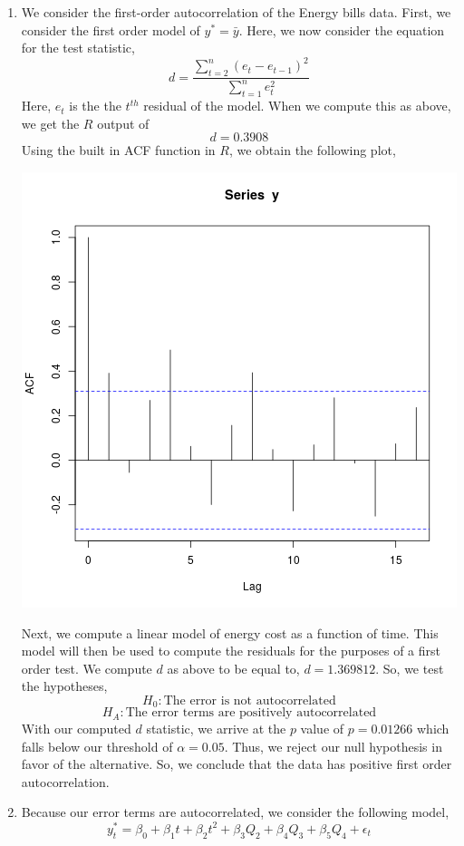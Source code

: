 \documentclass[letterpaper,10pt]{article}
\begin{document}
\begin{enumerate}
\item We consider the first-order autocorrelation of the Energy bills data. First, we consider the first order model of $y^*=\bar{y}$. Here, we now consider the equation for the test statistic,
\[d=\frac{\sum_{t=2}^n(e_t-e_{t-1})^2}{\sum_{t=1}^ne_t^2}\]
Here, $e_t$ is the the $t^{th}$ residual of the model. When we compute this as above, we get the $R$ output of
\[d=0.3908\]
Using the built in ACF function in $R$, we obtain the following plot,
\begin{center}
\includegraphics[scale=0.8]{acf.png}
\end{center}
Next, we compute a linear model of energy cost as a function of time. This model will then be used to compute the residuals for the purposes of a first order test. We compute $d$ as above to be equal to, $d=1.369812$. So, we test the hypotheses,
\[H_0: \text{The error is not autocorrelated}\]
\[H_A: \text{The error terms are positively autocorrelated}\]
With our computed $d$ statistic, we arrive at the $p$ value of $p=0.01266$ which falls below our threshold of $\alpha=0.05$. Thus, we reject our null hypothesis in favor of the alternative. So, we conclude that the data has positive first order autocorrelation.
\item Because our error terms are autocorrelated, we consider the following model,
\[y^*_t=\beta_0+\beta_1t+\beta_2t^2+\beta_3Q_2+\beta_4Q_3+\beta_5Q_4+\epsilon_t\]

\end{enumerate}
\end{document}
